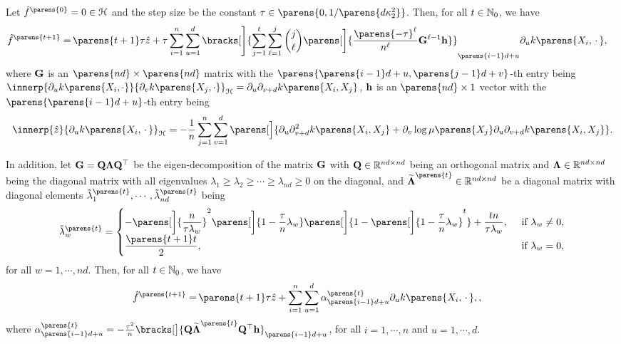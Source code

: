 \begin{theorem}\label{thm-early-stopping-algo}
	Let $\hat{f}^{\parens{0}} = 0 \in \calH$ and the step size be the constant $\tau \in \parens{0, 1 / \parens{d \kappa_2^2}}$. Then, for all $t \in \mathbb{N}_0$, we have 
	\begin{align}
		\hat{f}^{\parens{t+1}} = & \, \parens{t + 1} \tau \hat{z} + \tau \sum_{i=1}^n \sum_{u=1}^d \bracks[\Bigg]{\sum_{j=1}^t \sum_{\ell=1}^j {j \choose \ell} \parens[\bigg]{\frac{\parens{-\tau}^{\ell}}{n^{\ell}} \bG^{\ell-1} \bh}}_{\parens{i-1}d+u} \partial_u k \parens{X_i, \,\cdot\,} \label{eq-thm-early-stopping-algo-part1}, 
	\end{align}
	where $\mathbf{G}$ is an $\parens{nd} \times \parens{nd}$ matrix with the $\parens{\parens{i-1}d+u, \parens{j-1}d+v}$-th entry being $\innerp{\partial_u k \parens{X_i, \cdot}}{\partial_v k \parens{X_j, \cdot}}_{\calH} = \partial_u \partial_{v+d} k \parens{X_i, X_j}$, $\mathbf{h}$ is an $\parens{nd} \times 1$ vector with the $\parens{\parens{i-1}d+u}$-th entry being 
	\begin{align*}
		\innerp{\hat{z}}{\partial_u k \parens{X_i, \,\cdot\,}}_{\calH} = - \frac{1}{n} \sum_{j=1}^n \sum_{v=1}^d \parens[\Big]{\partial_u \partial^2_{v+d} k \parens{X_i, X_j} + \partial_v \log \mu \parens{X_j} \partial_u \partial_{v+d} k \parens{X_i, X_j}}. 
	\end{align*}
	
	In addition, let $\mathbf{G} = \mathbf{Q} \boldsymbol{\Lambda} \mathbf{Q}^\top$ be the eigen-decomposition of the matrix $\mathbf{G}$ with $\mathbf{Q} \in \mathbb{R}^{nd \times nd}$ being an orthogonal matrix and $\boldsymbol{\Lambda} \in \mathbb{R}^{nd \times nd}$ being the diagonal matrix with all eigenvalues $\lambda_1 \ge \lambda_2 \ge \cdots \ge \lambda_{nd} \ge 0$ on the diagonal, and $\widetilde{\bLambda}^{\parens{t}} \in \Real^{nd \times nd}$ be a diagonal matrix with diagonal elements $\tilde{\lambda}_1^{\parens{t}}, \cdots, \tilde{\lambda}_{nd}^{\parens{t}}$ being 
	\begin{align*}
		\tilde{\lambda}_{w}^{\parens{t}} = 
		\begin{cases}
			- \parens[\bigg]{\dfrac{n}{\tau \lambda_w}}^{2} \parens[\bigg]{1 - \dfrac{\tau}{n} \lambda_{w}} \parens[\bigg]{1 - \parens[\bigg]{1 - \dfrac{\tau}{n} \lambda_{w}}^t} + \dfrac{tn}{\tau \lambda_{w}}, & \, \text{ if } \lambda_{w} \neq 0, \\ 
			\dfrac{\parens{t+1} t}{2}, & \, \text{ if } \lambda_{w} = 0, 
		\end{cases}
	\end{align*}
	for all $w = 1, \cdots, nd$. Then, for all $t \in \mathbb{N}_0$, we have
	\begin{align}
		\hat{f}^{\parens{t+1}} = & \, \parens{t+1} \tau \hat{z} + \sum_{i=1}^n \sum_{u=1}^d \alpha_{\parens{i-1}d+u}^{\parens{t}} \partial_u k \parens{X_i, \,\cdot\,}, \label{eq-thm-early-stopping-algo-part2}, 
	\end{align}
	where $\alpha_{\parens{i-1}d+u}^{\parens{t}} = - \frac{\tau^2}{n} \bracks[\big]{\bQ \widetilde{\bLambda}^{\parens{t}} \bQ^\top \bh}_{\parens{i-1}d+u}$, for all $i = 1, \cdots, n$ and $u = 1, \cdots, d$. 
\end{theorem}

